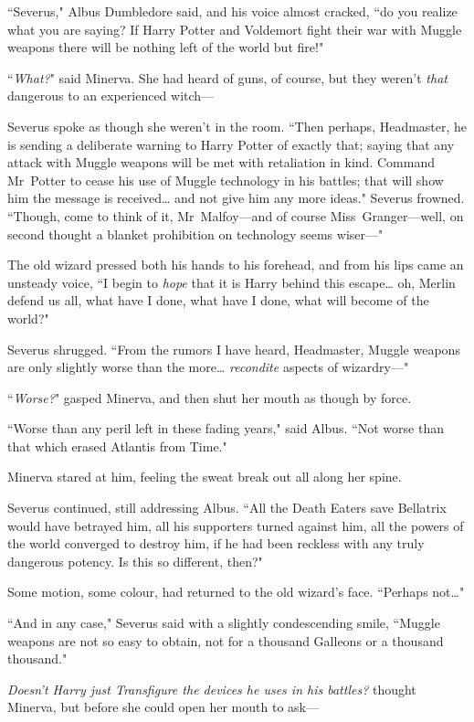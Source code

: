 ``Severus," Albus Dumbledore said, and his voice almost cracked, ``do you realize what you are saying? If Harry Potter and Voldemort fight their war with Muggle weapons there will be nothing left of the world but fire!"

``\emph{What?}" said Minerva. She had heard of guns, of course, but they weren't \emph{that} dangerous to an experienced witch—

Severus spoke as though she weren't in the room. ``Then perhaps, Headmaster, he is sending a deliberate warning to Harry Potter of exactly that; saying that any attack with Muggle weapons will be met with retaliation in kind. Command Mr~Potter to cease his use of Muggle technology in his battles; that will show him the message is received{\ldots} and not give him any more ideas." Severus frowned. ``Though, come to think of it, Mr~Malfoy—and of course Miss~Granger—well, on second thought a blanket prohibition on technology seems wiser—"

The old wizard pressed both his hands to his forehead, and from his lips came an unsteady voice, ``I begin to \emph{hope} that it is Harry behind this escape{\ldots} oh, Merlin defend us all, what have I done, what have I done, what will become of the world?"

Severus shrugged. ``From the rumors I have heard, Headmaster, Muggle weapons are only slightly worse than the more{\ldots} \emph{recondite} aspects of wizardry—"

``\emph{Worse?}" gasped Minerva, and then shut her mouth as though by force.

``Worse than any peril left in these fading years," said Albus. ``Not worse than that which erased Atlantis from Time."

Minerva stared at him, feeling the sweat break out all along her spine.

Severus continued, still addressing Albus. ``All the Death Eaters save Bellatrix would have betrayed him, all his supporters turned against him, all the powers of the world converged to destroy him, if he had been reckless with any truly dangerous potency. Is this so different, then?"

Some motion, some colour, had returned to the old wizard's face. ``Perhaps not{\ldots}"

``And in any case," Severus said with a slightly condescending smile, ``Muggle weapons are not so easy to obtain, not for a thousand Galleons or a thousand thousand."

\emph{Doesn't Harry just Transfigure the devices he uses in his battles?} thought Minerva, but before she could open her mouth to ask—

